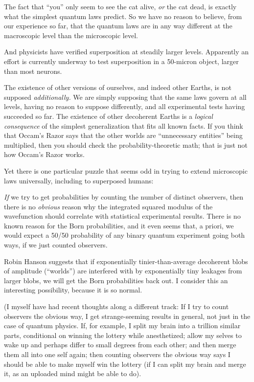 {
 The fact that ``you'' only seem
to see the cat alive, \textit{or} the cat dead, is exactly what the
simplest quantum laws predict. So we have no reason to believe, from
our experience so far, that the quantum laws are in any way different
at the macroscopic level than the microscopic level.}

{
 And physicists have verified superposition at steadily larger
levels. Apparently an effort is currently underway to test
superposition in a 50-micron object, larger than most neurons.}

{
 The existence of other versions of ourselves, and indeed other
Earths, is not supposed \textit{additionally.} We are simply supposing
that the same laws govern at all levels, having no reason to suppose
differently, and all experimental tests having succeeded so far. The
existence of other decoherent Earths is a \textit{logical consequence}
of the simplest generalization that fits all known facts. If you think
that Occam's Razor says that the other worlds are
``unnecessary entities'' being
multiplied, then you should check the probability-theoretic math; that
is just not how Occam's Razor works.}

{
 Yet there is one particular puzzle that seems odd in trying to
extend microscopic laws universally, including to superposed humans:}

{
 \textit{If} we try to get probabilities by counting the number of
distinct observers, then there is no \textit{obvious} reason why the
integrated squared modulus of the wavefunction should correlate with
statistical experimental results. There is no known reason for the Born
probabilities, and it even seems that, a priori, we would expect a
50/50 probability of any binary quantum experiment going both ways, if
we just counted observers.}

{
 Robin Hanson suggests that if exponentially tinier-than-average
decoherent blobs of amplitude
(``worlds'') are interfered with by
exponentially tiny leakages from larger blobs, we will get the Born
probabilities back out. I consider this an interesting possibility,
because it is so normal.}

{
 (I myself have had recent thoughts along a different track: If I
try to count observers the obvious way, I get strange-seeming results
in general, not just in the case of quantum physics. If, for example, I
split my brain into a trillion similar parts, conditional on winning
the lottery while anesthetized; allow my selves to wake up and perhaps
differ to small degrees from each other; and then merge them all into
one self again; then counting observers the obvious way says I should
be able to make myself win the lottery (if I can split my brain and
merge it, as an uploaded mind might be able to do).}

